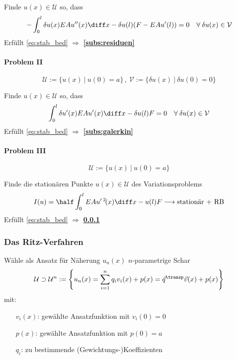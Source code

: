 				Finde $u(x) \in \mathcal{U}$ so, dass
				\[
					- \int_0^l \delta u(x) EAu''(x) \diff x - \delta u(l) (F - EAu'(l)) = 0 \quad \forall \: \delta u(x) \in \mathcal{V}
				\]
				Erfüllt \eqref{eq:stab_bed} $\Rightarrow$ \textbf{\ref{subs:residuen} }
			
			\paragraph{Problem II} %
				\[
					\mathcal{U} := \{
						u(x) \ | \ u(0) = a
					\} \, , \ 
					\mathcal{V} := \{
						\delta u(x) \ | \ \delta u(0) = 0
					\}
				\]
			
				Finde $u(x) \in \mathcal{U}$ so, dass
				\[
					\int_0^l \delta u'(x) EAu'(x) \diff x - \delta u(l) F = 0 \quad \forall \: \delta u(x) \in \mathcal{V}
				\]
				Erfüllt \eqref{eq:stab_bed} $\Rightarrow$ \textbf{\ref{subs:galerkin} }
			
			\paragraph{Problem III} %
				\[
					\mathcal{U} := \{
						u(x) \ | \ u(0) = a
					\}
				\]
			
				Finde die stationären Punkte $u(x) \in \mathcal{U}$ des Variationsproblems
				\[
					I(u) = \half \int_0^l EAu'^{\:2\!}(x) \diff x - u(l) F \longrightarrow \text{stationär + RB}
				\]
				Erfüllt \eqref{eq:stab_bed} $\Rightarrow$ \textbf{\ref{subs:ritz} }
		
		\subsubsection{Das Ritz-Verfahren} %
			\label{subs:ritz}
			Wähle als Ansatz für Näherung $u_n(x)$ $n$-parametrige Schar
			\[
				\mathcal U \supset \mathcal U^n := \left\{
					u_n(x) = \sum_{i=1}^n q_i v_i(x) + p(x) = \vec q^\transp \vec v(x) + p(x)
				\right\}
			\]
			mit:
			\begin{itemize}
				\item[$v_i(x)$:] gewählte Ansatzfunktion mit $v_i(0) = 0$
				\item[$p(x)$:] gewählte Ansatzfunktion mit $p(0) = a$
				\item[$q_i$:] zu bestimmende (Gewichtungs-)Koeffizienten
			\end{itemize}
			
